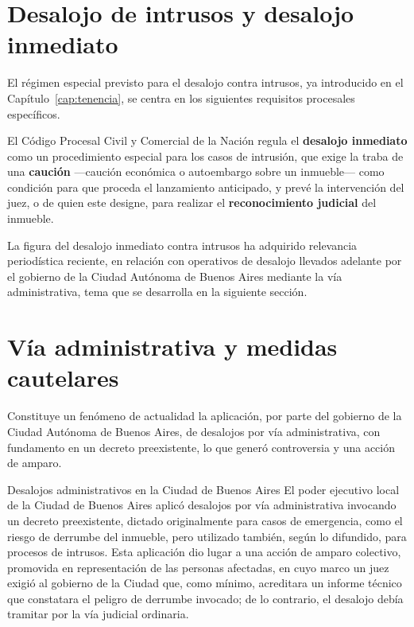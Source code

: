 \documentclass[12pt,oneside]{book}
\begin{document}
\section{Desalojo de intrusos y desalojo inmediato}

El régimen especial previsto para el desalojo contra intrusos, ya introducido en el Capítulo~\ref{cap:tenencia}, se centra en los siguientes requisitos procesales específicos.

\begin{normacitada}
El Código Procesal Civil y Comercial de la Nación regula el \textbf{desalojo inmediato} como un procedimiento especial para los casos de intrusión, que exige la traba de una \textbf{caución} ---caución económica o autoembargo sobre un inmueble--- como condición para que proceda el lanzamiento anticipado, y prevé la intervención del juez, o de quien este designe, para realizar el \textbf{reconocimiento judicial} del inmueble.
\end{normacitada}

\begin{note}
La figura del desalojo inmediato contra intrusos ha adquirido relevancia periodística reciente, en relación con operativos de desalojo llevados adelante por el gobierno de la Ciudad Autónoma de Buenos Aires mediante la vía administrativa, tema que se desarrolla en la siguiente sección.
\end{note}

\section{Vía administrativa y medidas cautelares}

Constituye un fenómeno de actualidad la aplicación, por parte del gobierno de la Ciudad Autónoma de Buenos Aires, de desalojos por vía administrativa, con fundamento en un decreto preexistente, lo que generó controversia y una acción de amparo.

\begin{example}{Desalojos administrativos en la Ciudad de Buenos Aires}
El poder ejecutivo local de la Ciudad de Buenos Aires aplicó desalojos por vía administrativa invocando un decreto preexistente, dictado originalmente para casos de emergencia, como el riesgo de derrumbe del inmueble, pero utilizado también, según lo difundido, para procesos de intrusos. Esta aplicación dio lugar a una acción de amparo colectivo, promovida en representación de las personas afectadas, en cuyo marco un juez exigió al gobierno de la Ciudad que, como mínimo, acreditara un informe técnico que constatara el peligro de derrumbe invocado; de lo contrario, el desalojo debía tramitar por la vía judicial ordinaria.
\end{example}
\end{document}
